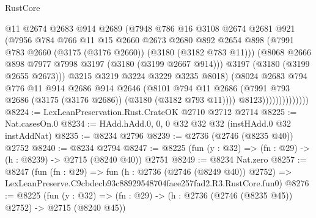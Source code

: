 \begin{lexlean}{RustCore}
\begin{coremodule}
                              @11
                              @2674
                              @2683
                              @914
                              @2689
                              (@7948
                                @786
                                @16
                                @3108
                                @2674
                                @2681
                                @921
                                (@7956
                                  @784
                                  @766
                                  @11
                                  @15
                                  @2660
                                  @2673
                                  @2680
                                  @892
                                  @2654
                                  @898
                                  (@7991 @783 @2660 (@3175 (@3176 @2660)) (@3180 (@3182 @783 @11)))
                                  (@8068 @2666 @898 @7977 @7998 @3197 (@3180 (@3199 @2667 @914)))
                                  @3197
                                  (@3180 (@3199 @2655 @2673)))
                                @3215
                                @3219
                                @3224
                                @3229
                                @3235
                                @8018)
                              (@8024
                                @2683
                                @794
                                @776
                                @11
                                @914
                                @2686
                                @914
                                @2646
                                (@8101
                                  @794
                                  @11
                                  @2686
                                  (@7991 @793 @2686 (@3175 (@3176 @2686)) (@3180 (@3182 @793 @11))))
                                @8123))))))))))))))
@8224 := LexLeanPreservation.Rust.CrateOK @2710 @2712 @2714
@8225 := Nat.casesOn.{0}
@8234 := HAdd.hAdd.{0, 0, 0} @32 @32 @32 (instHAdd.{0} @32 instAddNat)
@8235 := @8234 @2796
@8239 := @2736 (@2746 (@8235 @40)) @2752
@8240 := @8234 @2794
@8247 := @8225 (fun (y : @32) => (fn : @29) -> (h : @8239) -> @2715 (@8240 @40)) @2751
@8249 := @8234 Nat.zero
@8257 := @8247
    (fun (fn : @29) =>
    fun (h : @2736 (@2746 (@8249 @40)) @2752) =>
    LexLeanPreserve.C9cbdecb93c88929548704faee257fad2.R3.RustCore.fun0)
@8276 := @8225
    (fun (y : @32) => (fn : @29) -> (h : @2736 (@2746 (@8235 @45)) @2752) -> @2715 (@8240 @45))

\end{coremodule}
\end{lexlean}
